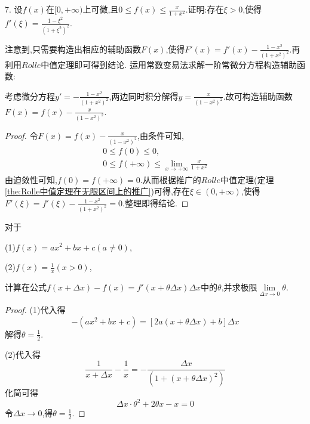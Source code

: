 \documentclass[lang=cn,newtx,10pt,scheme=chinese]{../Template/elegantbook}
\begin{document}
\begin{exercise}
7. 设\(f(x)\)在\([0,+\infty)\)上可微,且\(0\leqslant f(x)\leqslant\frac{x}{1 + x^2}\).证明:存在\(\xi>0\),使得\(f'(\xi)=\frac{1-\xi^{2}}{(1+\xi^{2})^{2}}\).
    \begin{note}
        注意到,只需要构造出相应的辅助函数$F(x)$,使得$F'(x)=f'(x)-\frac{1-x^{2}}{(1+x^{2})^{2}}$.再利用$Rolle$中值定理即可得到结论.
        运用常数变易法求解一阶常微分方程构造辅助函数:

        考虑微分方程$y'=-\frac{1-x^{2}}{(1+x^{2})^{2}}$,两边同时积分解得$y=\frac{x}{(1-x^2)^2}$.故可构造辅助函数$F(x)=f(x)-\frac{x}{(1-x^2)^2}$.
    \end{note}
    \begin{proof}
        令$F(x)=f(x)-\frac{x}{(1-x^2)^2}$,由条件可知,
        \begin{gather}
            0\leqslant f(0)\leqslant 0,
            \nonumber
            \\
            0\leqslant f(+\infty)\leqslant \lim_{x \to +\infty} \frac{x}{1+x^2} 
            \nonumber
        \end{gather}
        由迫敛性可知,$f(0)=f(+\infty)=0$.从而根据推广的$Rolle$中值定理(定理\ref{the:Rolle中值定理在无限区间上的推广})可得,存在$\xi\in(0,+\infty)$,使得$F'(\xi)=f'(\xi)-\frac{1-x^2}{(1+x^2)^2}=0$.整理即得结论.
    
\end{proof}
\end{exercise}

\begin{exercise}
对于

(1)\(f(x)=ax^2 + bx + c(a\neq0)\),

(2)\(f(x)=\frac{1}{x}(x>0)\),

计算在公式\(f(x+\Delta x)-f(x)=f'(x+\theta\Delta x)\Delta x\)中的\(\theta\),并求极限\(\lim\limits_{\Delta x\to0}\theta\).
    \begin{proof}
    (1)代入得
    \begin{equation}
    [a(x+\Delta x)^2+b(x+\Delta x)+c]-(ax^2+bx+c)=[2a(x+\theta \Delta x)+b]\Delta x
        \nonumber
    \end{equation}
    解得$\theta=\frac{1}{2}$.

    (2)代入得
    \begin{equation}
    \frac{1}{x+\Delta x}-\frac{1}{x}=-\frac{\Delta x}{(1+(x+\theta \Delta x)^2)}
        \nonumber
    \end{equation}
    化简可得
    \begin{equation}
    \Delta x\cdot\theta^2+2\theta x-x=0
        \nonumber
    \end{equation}
    令$\Delta x \to 0$,得$\theta=\frac{1}{2}$.
    
\end{proof}
\end{exercise}
\end{document}
